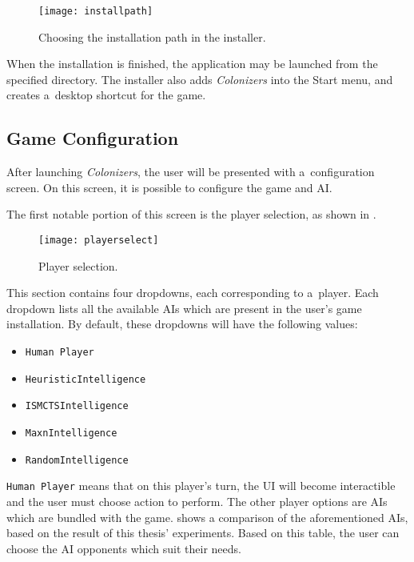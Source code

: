 \begin{figure}[ht]
\centerline{\mbox{\texttt{[image: installpath]}}}
\caption{Choosing the installation path in the installer.}\label{ud:installpath}
\end{figure}

When the installation is finished, the application may be launched from the specified
directory. The installer also adds \emph{Colonizers} into the Start menu, and creates
a~desktop shortcut for the game.

\subsection{Game Configuration}

After launching \emph{Colonizers}, the user will be presented with a~configuration
screen. On this screen, it is possible to configure the game and AI.

The first notable portion of this screen is the player selection, as shown
in .

\begin{figure}[ht]
\centerline{\mbox{\texttt{[image: playerselect]}}}
\caption{Player selection.}\label{ud:playerselect}
\end{figure}

This section contains four dropdowns, each
corresponding to a~player. Each dropdown lists all the available AIs
which are present in the user's game installation. By default, these dropdowns
will have the following values:
\begin{itemize}
    \item \texttt{Human Player}
    \item \texttt{HeuristicIntelligence}
    \item \texttt{ISMCTSIntelligence}
    \item \texttt{MaxnIntelligence}
    \item \texttt{RandomIntelligence}
\end{itemize}
\texttt{Human Player} means that on this player's turn, the UI will become interactible
and the user must choose action to perform. The other player options are AIs which
are bundled with the game.  shows a comparison of the aforementioned
AIs, based on the result of this thesis' experiments. Based on this table,
the user can choose the AI opponents which suit their needs.

